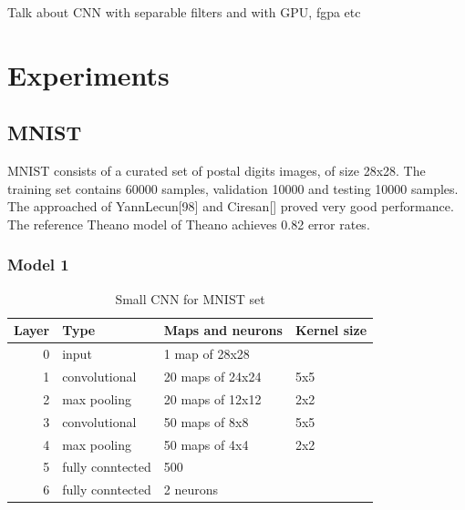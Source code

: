 \documentclass{article} %
\begin{document}
Talk about CNN with separable filters and with GPU, fgpa etc

\section{Experiments}
\subsection{MNIST}
MNIST consists of a curated set of postal digits images, of size 28x28.
The training set contains 60000 samples, validation 10000 and testing
10000 samples.
The approached of YannLecun[98] and Ciresan[] proved very good performance. The reference Theano model of Theano achieves 0.82 error rates.
\subsubsection{Model 1}
\begin{table}
\centering
\begin{tabular}{@{}rlll@{}}\toprule
Layer & Type & Maps and neurons& Kernel size \\ \midrule
0 & input & 1 map of 28x28 &\\
1& convolutional & 20 maps of 24x24 & 5x5\\
2 & max pooling & 20 maps of 12x12 & 2x2 \\
3 & convolutional & 50 maps of 8x8& 5x5 \\
4 & max pooling & 50 maps of 4x4& 2x2 \\ 
5 & fully conntected& 500 & \\
6 & fully conntected & 2 neurons & \\ \bottomrule
\end{tabular}
\caption{Small CNN for MNIST set}
\end{table}
\end{document}
